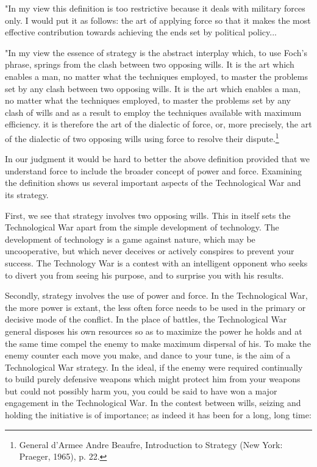 "In my view this definition is too restrictive because it deals with military forces only. I would put it as follows: the art of applying force so that it makes the most effective contribution towards achieving the ends set by political policy...

"In my view the essence of strategy is the abstract interplay which, to use Foch's phrase, springs from the clash between two opposing wills. It is the art which enables a man, no matter what the techniques employed, to master the problems set by any clash between two opposing wills. It is the art which enables a man, no matter what the techniques employed, to master the problems set by any clash of wills and as a result to employ the techniques available with maximum efficiency. it is therefore the art of the dialectic of force, or, more precisely, the art of the dialectic of two opposing wills using force to resolve their dispute.\footnote{General d'Armee Andre Beaufre, Introduction to Strategy (New York: Praeger, 1965), p. 22.}

In our judgment it would be hard to better the above definition provided that we understand force to include the broader concept of power and force. Examining the definition shows us several important aspects of the Technological War and its strategy.

First, we see that strategy involves two opposing wills. This in itself sets the Technological War apart from the simple development of technology. The development of technology is a game against nature, which may be uncooperative, but which never deceives or actively conspires to prevent your success. The Technology War is a contest with an intelligent opponent who seeks to divert you from seeing his purpose, and to surprise you with his results.

Secondly, strategy involves the use of power and force. In the Technological War, the more power is extant, the less often force needs to be used in the primary or decisive mode of the conflict. In the place of battles, the Technological War general disposes his own resources so as to maximize the power he holds and at the same time compel the enemy to make maximum dispersal of his. To make the enemy counter each move you make, and dance to your tune, is the aim of a Technological War strategy. In the ideal, if the enemy were required continually to build purely defensive weapons which might protect him from your weapons but could not possibly harm you, you could be said to have won a major engagement in the Technological War. In the contest between wills, seizing and holding the initiative is of importance; as indeed it has been for a long, long time:

